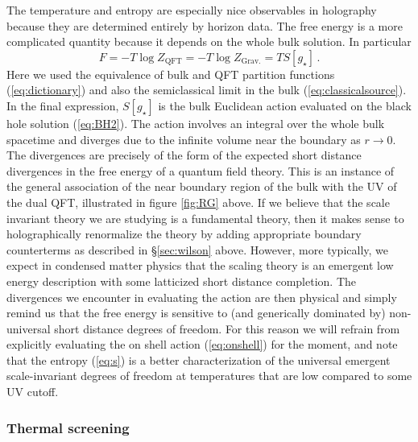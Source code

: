 \documentclass[10pt, oneside]{book}
\def\be{\begin{equation}}
\def\ee{\end{equation}}
\begin{document}
\begin{doublespace}
The temperature and entropy are especially nice observables in holography because they are determined entirely by horizon data. The free energy is a more complicated quantity because it depends on the whole bulk solution. In particular
\be\label{eq:onshell}
F = - T \log Z_\text{QFT} = - T \log Z_\text{Grav.} = T S[g_\star] \,.
\ee
Here we used the equivalence of bulk and QFT partition functions (\ref{eq:dictionary}) and also the semiclassical limit in the bulk (\ref{eq:classicalsource}). In the final expression, $S[g_\star]$ is the bulk Euclidean action evaluated on the black hole solution (\ref{eq:BH2}). The action involves an integral over the whole bulk spacetime and diverges due to the infinite volume near the boundary as $r \to 0$. The divergences are precisely of the form of the expected short distance divergences in the free energy of a quantum field theory. This is an instance of the general association of the near boundary region of the bulk with the UV of the dual QFT, illustrated in figure \ref{fig:RG} above. If we believe that the scale invariant theory we are studying is a fundamental theory, then it makes sense to holographically renormalize the theory by adding appropriate boundary counterterms as described in \S\ref{sec:wilson} above. However, more typically, we expect in condensed matter physics that the scaling theory is an emergent low energy description with some latticized short distance completion. The divergences we encounter in evaluating the action are then physical and simply remind us that the free energy is sensitive to (and generically dominated by) non-universal short distance degrees of freedom. For this reason we will refrain from explicitly evaluating the on shell action (\ref{eq:onshell}) for the moment, and note that the entropy (\ref{eq:s}) is a better characterization of the universal emergent scale-invariant degrees of freedom at temperatures that are low compared to some UV cutoff.

\subsubsection{Thermal screening}


\end{doublespace}
\end{document}
